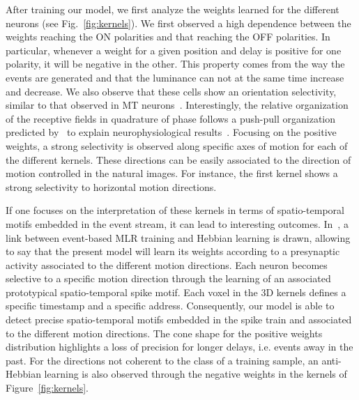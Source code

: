 \documentclass[default]{sn-jnl}%
\theoremstyle{thmstyleone}%
\theoremstyle{thmstyletwo}%
\theoremstyle{thmstylethree}%
\newcommand{\seeFig}[1]{see Fig.~\ref{fig:#1}}%
\begin{document}
%
%
After training our model, we first analyze the weights learned for the different neurons (\seeFig{kernels}). 
We first observed a high dependence between the weights reaching the ON polarities and that reaching the OFF polarities. In particular, whenever a weight for a given position and delay is positive for one polarity, it will be negative in the other. This property comes from the way the events are generated and that the luminance can not at the same time increase and decrease. %
We also observe that these cells show an orientation selectivity, similar to that observed in MT neurons~\citep{deangelis_functional_1999}. Interestingly, the relative organization of the receptive fields in quadrature of phase follows a push-pull organization predicted by~\citet{kremkow_push-pull_2016} to explain neurophysiological results~\citep{baudot_animation_2013}.  
Focusing on the positive weights, a strong selectivity is observed along specific axes of motion for each of the different kernels. These directions can be easily associated to the direction of motion controlled in the natural images. For instance, the first kernel shows a strong selectivity to horizontal motion directions.
%

If one focuses on the interpretation of these kernels in terms of spatio-temporal motifs embedded in the event stream, it can lead to interesting outcomes. In~\citep{grimaldi_robust_2022}, a link between event-based MLR training and Hebbian learning is drawn, allowing to say that the present model will learn its weights according to a presynaptic activity associated to the different motion directions. Each neuron becomes selective to a specific motion direction through the learning of an associated prototypical spatio-temporal spike motif. Each voxel in the 3D kernels defines a specific timestamp and a specific address. Consequently, our model is able to detect precise spatio-temporal motifs embedded in the spike train and associated to the different motion directions. The cone shape for the positive weights distribution highlights a loss of precision for longer delays, i.e. events away in the past. For the directions not coherent to the class of a training sample, an anti-Hebbian learning is also observed through the negative weights in the kernels of Figure~\ref{fig:kernels}. 
\end{document}
